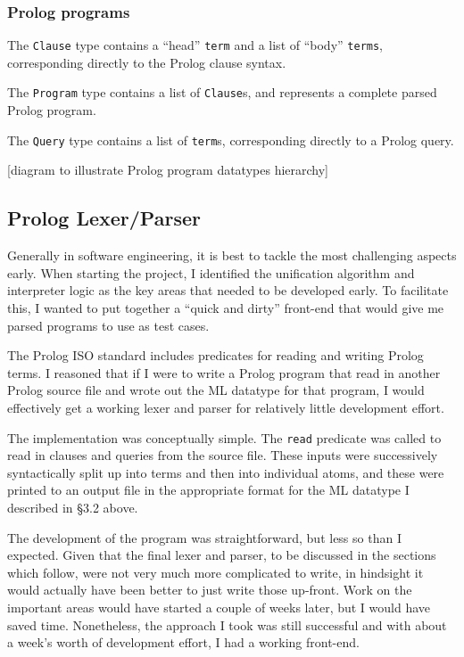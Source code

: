 \documentclass[12pt]{article}
\begin{document}
\subsubsection{Prolog programs}

The \verb|Clause| type contains a ``head'' \verb|term| and a list of ``body'' \verb|terms|, corresponding directly to the Prolog clause syntax.

The \verb|Program| type contains a list of \verb|Clause|s, and represents a complete parsed Prolog program.

The \verb|Query| type contains a list of \verb|term|s, corresponding directly to a Prolog query.

[diagram to illustrate Prolog program datatypes hierarchy]

\subsection{Prolog Lexer/Parser}

Generally in software engineering, it is best to tackle the most challenging aspects early. 
When starting the project, I identified the unification algorithm and interpreter logic as the key areas that needed to be developed early. 
To facilitate this, I wanted to put together a ``quick and dirty'' front-end that would give me parsed programs to use as test cases.

The Prolog ISO standard includes predicates for reading and writing Prolog terms. 
I reasoned that if I were to write a Prolog program that read in another Prolog source file and wrote out the ML datatype for that program, I would effectively get a working lexer and parser for relatively little development effort. 

The implementation was conceptually simple. 
The \verb|read| predicate was called to read in clauses and queries from the source file. 
These inputs were successively syntactically split up into terms and then into individual atoms, and these were printed to an output file in the appropriate format for the ML datatype I described in \S3.2 above.

The development of the program was straightforward, but less so than I expected. 
Given that the final lexer and parser, to be discussed in the sections which follow, were not very much more complicated to write, in hindsight it would actually have been better to just write those up-front. 
Work on the important areas would have started a couple of weeks later, but I would have saved time.
Nonetheless, the approach I took was still successful and with about a week's worth of development effort, I had a working front-end.
\end{document}
